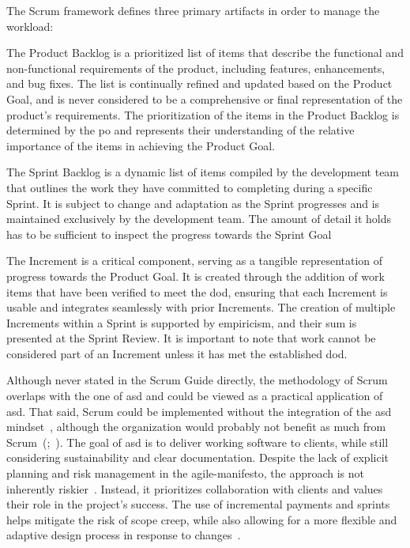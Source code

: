 The Scrum \gls{framework} defines three primary artifacts in order to manage the workload:

\begin{description}[style=nextline]
    \item[Product Backlog]
    The Product Backlog is a prioritized list of items that describe the functional and non-functional requirements of the product, including features, enhancements, and bug fixes. The list is continually refined and updated based on the Product Goal, and is never considered to be a comprehensive or final representation of the product's requirements. The prioritization of the items in the Product Backlog is determined by the \ac{po} and represents their understanding of the relative importance of the items in achieving the Product Goal.~\cite[pp.~10--11]{Schwaber2020Tsg}
    \item[Sprint Backlog]
    The Sprint Backlog is a dynamic list of items compiled by the development team that outlines the work they have committed to completing during a specific Sprint. It is subject to change and \gls{adaptation} as the Sprint progresses and is maintained exclusively by the development team. The amount of detail it holds has to be sufficient to inspect the progress towards the Sprint Goal~\cite[p.~11]{Schwaber2020Tsg}
    \item[Increment]
    The Increment is a critical component, serving as a tangible representation of progress towards the Product Goal. It is created through the addition of work items that have been verified to meet the \gls{dod}, ensuring that each Increment is usable and integrates seamlessly with prior Increments. The creation of multiple Increments within a Sprint is supported by empiricism, and their sum is presented at the Sprint Review. It is important to note that work cannot be considered part of an Increment unless it has met the established \gls{dod}.~\cite[pp.~11--12]{Schwaber2020Tsg}
\end{description}

Although never stated in the Scrum Guide directly, the \gls{methodology} of Scrum overlaps with the one of \acf{asd} and could be viewed as a practical application of \ac{asd}. That said, Scrum could be implemented without the integration of the \ac{asd} \gls{mindset}~\cite[p.~56]{Moreira2013FoA}, although the organization would probably not benefit as much from Scrum~(;~). The goal of \ac{asd} is to deliver working software to \glspl{client}, while still considering sustainability and clear documentation. Despite the lack of explicit planning and risk management in the \ac{agile-manifesto}, the approach is not inherently riskier~\cite[p.~3]{battoia2019innovation}. Instead, it prioritizes collaboration with \glspl{client} and values their role in the project's success. The use of incremental payments and sprints helps mitigate the risk of scope creep, while also allowing for a more flexible and adaptive design process in response to changes~\cite{Beck2001MfA}.

